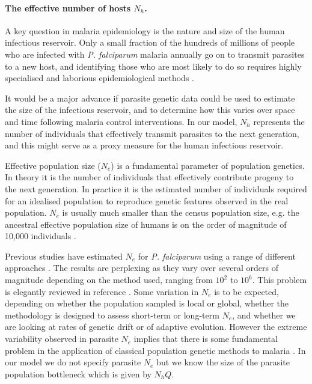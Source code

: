 \documentclass[_main.tex]{subfiles}
\begin{document}
\paragraph{The effective number of hosts $N_h$.}  A key question in malaria epidemiology is the nature and size of the human infectious reservoir.  Only a small fraction of the hundreds of millions of people who are infected with \textit{P. falciparum} malaria annually \cite{WHO2022} go on to transmit parasites to a new host, and identifying those who are most likely to do so requires highly specialised and laborious epidemiological methods \cite{Goncalves2017}.  

It would be a major advance if parasite genetic data could be used to estimate the size of the infectious reservoir, and to determine how this varies over space and time following malaria control interventions.  In our model, $N_h$ represents the number of individuals that effectively transmit parasites to the next generation, and this might serve as a proxy measure for the human infectious reservoir.  

Effective population size ($N_e$) is a fundamental parameter of population genetics.  In theory it is the number of individuals that effectively contribute progeny to the next generation. In practice it is the estimated number of individuals required for an idealised population to reproduce genetic features observed in the real population.  $N_e$ is usually much smaller than the census population size, e.g. the ancestral effective population size of humans is on the order of magnitude of 10,000 individuals \cite{Henn2012}. 

Previous studies have estimated $N_e$ for \textit{P. falciparum} using a range of different approaches  \cite{Joy2003,Chang2012,Nkhoma2013,Anderson2017}.  The results are perplexing as they vary over several orders of magnitude depending on the method used, ranging from $10^2$ to $10^6$.  This problem is elegantly reviewed in reference \cite{Anderson2017}.  Some variation in $N_e$ is to be expected, depending on whether the population sampled is local or global, whether the methodology is designed to assess short-term or long-term $N_e$, and whether we are looking at rates of genetic drift or of adaptive evolution.  However the extreme variability observed in parasite $N_e$ implies that there is some fundamental problem in the application of classical population genetic methods to malaria \cite{Chan2013,Chang2015,Anderson2017}.  In our model we do not specify parasite $N_e$ but we know the size of the parasite population bottleneck which is given by $N_h Q$.  
\end{document}
